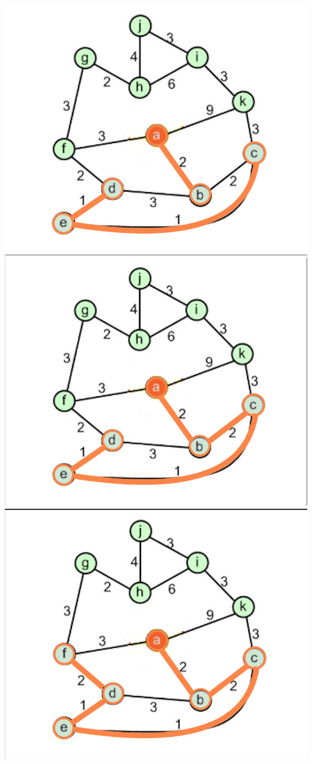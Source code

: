 \documentclass[a4paper]{exam}
\begin{document}
\begin{questions}
\begin{parts}
\begin{solution}
    \includegraphics[scale=0.25]{Q3/images3e/3e4}
    \includegraphics[scale=0.25]{Q3/images3e/3e5}
    \includegraphics[scale=0.25]{Q3/images3e/3e6}\\

\end{solution}
\end{parts}
\end{questions}
\end{document}
